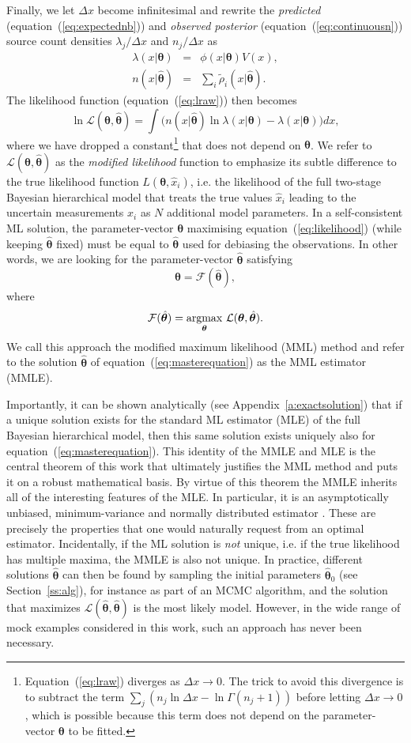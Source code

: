 \documentclass[a4paper,fleqn,usenatbib]{mnras}
\newcommand{\be}{\begin{equation}}
\newcommand{\ee}{\end{equation}}
\newcommand{\Dx}{\Delta x}
\newcommand{\dx}{dx}
\newcommand{\veff}{V}%
\renewcommand{\L}{\mathcal{L}}
\newcommand{\eq}[1]{equation~(\ref{eq:#1})}
\newcommand{\Eq}[1]{Equation~(\ref{eq:#1})}
\renewcommand{\ss}[1]{Section~\ref{ss:#1}}
\renewcommand{\a}[1]{Appendix~\ref{a:#1}}
\newcommand{\ie}{i.e.\xspace}
\newcommand{\para}{{\bm{\theta}}}
\begin{document}
Finally, we let $\Dx$ become infinitesimal and rewrite the \textit{predicted} (\eq{expectednb}) and \textit{observed posterior} (\eq{continuousn}) source count densities $\lambda_j/\Dx$ and $n_j/\Dx$ as
%
\begin{eqnarray}
	\lambda(x|\para) & = & \phi(x|\para)\veff(x), \label{eq:deflambda} \\
	n(x|\hat\para) & = & \sum_i\tilde{\rho}_i(x|\hat\para). \label{eq:defn}
\end{eqnarray}
%
The likelihood function (\eq{lraw}) then becomes
%
\be\label{eq:likelihood}
	\ln \L(\para,\hat\para) = \int\Big(n(x|\hat\para)\ln\lambda(x|\para)-\lambda(x|\para)\Big)\dx,
\ee
%
where we have dropped a constant\footnote{\Eq{lraw} diverges as $\Dx\rightarrow0$. The trick to avoid this divergence is to subtract the term $\sum_j(n_j\ln \Dx-\ln\Gamma(n_j+1))$ before letting $\Dx\rightarrow0$, which is possible because this term does not depend on the parameter-vector $\para$ to be fitted.} that does not depend on $\para$. We refer to $\L(\para,\hat\para)$ as the \emph{modified likelihood} function to emphasize its subtle difference to the true likelihood function $L(\para,\hat{x}_i)$, \ie the likelihood of the full two-stage Bayesian hierarchical model \citep{Allenby2005} that treats the true values $\hat{x}_i$ leading to the uncertain measurements $x_i$ as $N$ additional model parameters. In a self-consistent ML solution, the parameter-vector $\para$ maximising \eq{likelihood} (while keeping $\hat\para$ fixed) must be equal to $\hat\para$ used for debiasing the observations. In other words, we are looking for the parameter-vector $\hat\para$ satisfying
%
\be\label{eq:masterequation}
	\hat\para = \mathcal{F}(\hat\para),
\ee
%
where
\be
	\mathcal{F}(\hat\para)=\underset{\para}{\rm argmax}~\L(\para,\hat\para).
\ee
We call this approach the modified maximum likelihood (MML) method and refer to the solution $\hat\para$ of \eq{masterequation} as the MML estimator (MMLE).

Importantly, it can be shown analytically (see \a{exactsolution}) that if a unique solution exists for the standard ML estimator (MLE) of the full Bayesian hierarchical model, then this same solution exists uniquely also for \eq{masterequation}. This identity of the MMLE and MLE is the central theorem of this work that ultimately justifies the MML method and puts it on a robust mathematical basis. By virtue of this theorem the MMLE inherits all of the interesting features of the MLE. In particular, it is an asymptotically unbiased, minimum-variance and normally distributed estimator \citep{Kendall1979}. These are precisely the properties that one would naturally request from an optimal estimator. Incidentally, if the ML solution is \emph{not} unique, \ie if the true likelihood has multiple maxima, the MMLE is also not unique. In practice, different solutions $\hat\para$ can then be found by sampling the initial parameters $\hat\para_0$ (see \ss{alg}), for instance as part of an MCMC algorithm, and the solution that maximizes $ \L(\hat\para,\hat\para)$ is the most likely model. However, in the wide range of mock examples considered in this work, such an approach has never been necessary.
\end{document}
